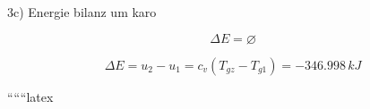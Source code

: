 3c) \quad Energie bilanz um karo

\[
\Delta E = \varnothing
\]

\[
\Delta E = u_2 - u_1 = c_v (T_{gz} - T_{g1}) = -346.998 \, kJ
\]

``````latex